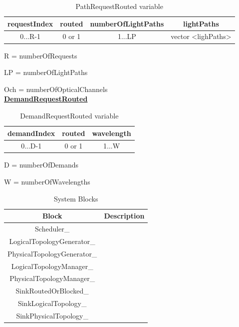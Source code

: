 \begin{table}[H]
	\centering
	\begin{tabular}{| c | c | c | c |}
		\hline
		\textbf{requestIndex} & \textbf{routed} & \textbf{numberOfLightPaths} & \textbf{lightPaths}\\ \hline
		0...R-1               & 0 or 1          & 1...LP                      & vector <lighPaths> \\ \hline
	\end{tabular}
	\caption{PathRequestRouted variable}
	\label{path_request_routed}
\end{table}

R = numberOfRequests\par
LP = numberOfLightPaths\par  
Och = numberOfOpticalChannels\\


\underline{\textbf{DemandRequestRouted}}

\begin{table}[H]
	\centering
	\begin{tabular}{| c | c | c |}
		\hline
		\textbf{demandIndex} & \textbf{routed}  & \textbf{wavelength}\\ \hline
		0...D-1              & 0 or 1           & 1...W              \\ \hline
	\end{tabular}
	\caption{DemandRequestRouted variable}
	\label{demand_request_routed}
\end{table}

D = numberOfDemands\par
W = numberOfWavelengths\\


\newpage
\vspace{11pt}

\begin{table}[H]
	\centering
	\begin{tabular}{| c | c |}
		\hline
		\textbf{Block}              & \textbf{Description}\\ \hline
		Scheduler\_                 &                     \\ \hline
		LogicalTopologyGenerator\_  &                     \\ \hline
		PhysicalTopologyGenerator\_ &                     \\ \hline
		LogicalTopologyManager\_    &                     \\ \hline
		PhysicalTopologyManager\_   &                     \\ \hline
		SinkRoutedOrBlocked\_       &                     \\ \hline
		SinkLogicalTopology\_       &                     \\ \hline
		SinkPhysicalTopology\_      &                     \\ \hline
	\end{tabular}
	\caption{System Blocks}
	\label{system_blocks}
\end{table}


